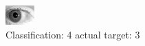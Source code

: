 \begin{figure}[h!]
\begin{center}
\includegraphics[width=0.60\columnwidth]{figures/ID258_class_4_target_3.png}
\end{center}
\caption{ Classification: 4 actual target: 3}
\label{fig:ID258_class_4_target_3}
\end{figure}
